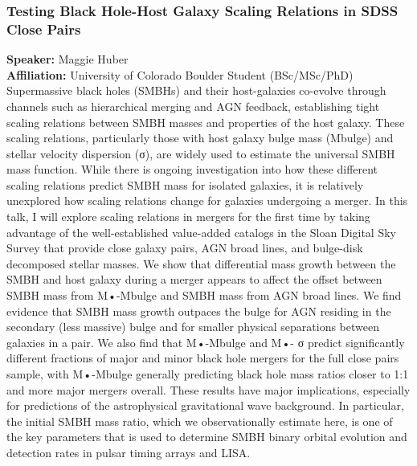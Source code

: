 \subsubsection*{Testing Black Hole-Host Galaxy Scaling Relations in SDSS Close Pairs}
\textbf{Speaker:} Maggie Huber \\
\textbf{Affiliation:} University of Colorado Boulder \textperiodcentered{} Student (BSc/MSc/PhD)\\
Supermassive black holes (SMBHs) and their host-galaxies co-evolve through channels such as hierarchical merging and AGN feedback, establishing tight scaling relations between SMBH masses and properties of the host galaxy. These scaling relations, particularly those with host galaxy bulge mass (Mbulge) and stellar velocity dispersion (σ), are widely used to estimate the universal SMBH mass function. While there is ongoing investigation into how these different scaling relations predict SMBH mass for isolated galaxies, it is relatively unexplored how scaling relations change for galaxies undergoing a merger. In this talk, I will explore scaling relations in mergers for the first time by taking advantage of the well-established value-added catalogs in the Sloan Digital Sky Survey that provide close galaxy pairs, AGN broad lines, and bulge-disk decomposed stellar masses. We show that differential mass growth between the SMBH and host galaxy during a merger appears to affect the offset between SMBH mass from M•-Mbulge and SMBH mass from AGN broad lines. We find evidence that SMBH mass growth outpaces the bulge for AGN residing in the secondary (less massive) bulge and for smaller physical separations between galaxies in a pair. We also find that M•-Mbulge and M•- σ predict significantly different fractions of major and minor black hole mergers for the full close pairs sample, with M•-Mbulge generally predicting black hole mass ratios closer to 1:1 and more major mergers overall. These results have major implications, especially for predictions of the astrophysical gravitational wave background. In particular, the initial SMBH mass ratio, which we observationally estimate here, is one of the key parameters that is used to determine SMBH binary orbital evolution and detection rates in pulsar timing arrays and LISA.

\hypertarget{abs-19}{}
